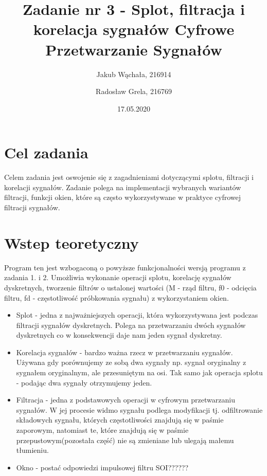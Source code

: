\documentclass[12pt]{article}
\title{{\bf Zadanie nr 3 - Splot, filtracja i korelacja sygnałów}\linebreak
Cyfrowe Przetwarzanie Sygnałów}
\author{Jakub Wąchała, 216914 \and Radosław Grela, 216769}
\date{17.05.2020}
\begin{document}
\clearpage\maketitle
\thispagestyle{empty}
\newpage
\setcounter{page}{1}
\section{Cel zadania}
\label{cel}
Celem zadania jest oswojenie się z zagadnieniami dotyczącymi splotu, filtracji i korelacji sygnałów. Zadanie polega na implementacji wybranych wariantów filtracji, funkcji okien, które są często wykorzystywane w praktyce cyfrowej filtracji sygnałów. 

\section{Wstep teoretyczny}
Program ten jest wzbogaconą o powyższe funkcjonalności wersją programu z zadania 1. i 2. Umożliwia wykonanie operacji splotu, korelację sygnałów dyskretnych, tworzenie filtrów o ustalonej wartości (M - rząd filtru, f0 - odcięcia filtru, fd - częstotliwość próbkowania sygnału) z wykorzystaniem okien. 
\begin{itemize}
\item Splot - jedna z najważniejszych operacji, która wykorzystywana jest podczas filtracji sygnałów dyskretnych. Polega na przetwarzaniu dwóch sygnałów dyskretnych co w konsekwencji daje nam jeden sygnał dyskretny.
\item Korelacja sygnałów - bardzo ważna rzecz w przetwarzaniu sygnałów. Używana gdy porównujemy ze sobą dwa sygnały np. sygnał oryginalny z sygnałem oryginalnym, ale przesuniętym na osi. Tak samo jak operacja splotu - podając dwa sygnały otrzymujemy jeden.
\item Filtracja - jedna z podstawowych operacji w cyfrowym przetwarzaniu sygnałów. W jej procesie widmo sygnału podlega modyfikacji tj. odfiltrowanie składowych sygnału, których częstotliwości znajdują się w paśmie zaporowym, natomiast te, które znajdują się w paśmie przepustowym(pozostała część) nie są zmieniane lub ulegają małemu tłumieniu.
\item Okno - postać odpowiedzi impulsowej filtru SOI??????
\end{itemize}
\end{document}
